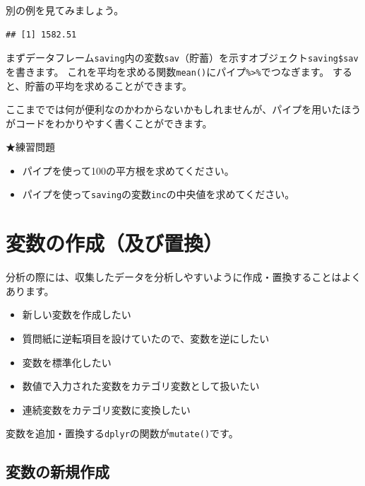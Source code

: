 \documentclass[]{book}
\newenvironment{Shaded}{\begin{snugshade}}{\end{snugshade}}
\newcommand{\KeywordTok}[1]{\textcolor[rgb]{0.13,0.29,0.53}{\textbf{#1}}}
\newcommand{\StringTok}[1]{\textcolor[rgb]{0.31,0.60,0.02}{#1}}
\newcommand{\OperatorTok}[1]{\textcolor[rgb]{0.81,0.36,0.00}{\textbf{#1}}}
\newcommand{\NormalTok}[1]{#1}
\providecommand{\tightlist}{%
  \setlength{\itemsep}{0pt}\setlength{\parskip}{0pt}}
\begin{document}
別の例を見てみましょう。

\begin{Shaded}
\end{Shaded}

\begin{verbatim}
## [1] 1582.51
\end{verbatim}

まずデータフレーム\texttt{saving}内の変数\texttt{sav}（貯蓄）を示すオブジェクト\texttt{saving\$sav}を書きます。
これを平均を求める関数\texttt{mean()}にパイプ\texttt{\%\textgreater{}\%}でつなぎます。
すると、貯蓄の平均を求めることができます。

ここまででは何が便利なのかわからないかもしれませんが、パイプを用いたほうがコードをわかりやすく書くことができます。

★練習問題

\begin{itemize}
\tightlist
\item
  パイプを使って100の平方根を求めてください。
\item
  パイプを使って\texttt{saving}の変数\texttt{inc}の中央値を求めてください。
\end{itemize}

\section{変数の作成（及び置換）}\label{ux5909ux6570ux306eux4f5cux6210ux53caux3073ux7f6eux63db}

分析の際には、収集したデータを分析しやすいように作成・置換することはよくあります。

\begin{itemize}
\tightlist
\item
  新しい変数を作成したい
\item
  質問紙に逆転項目を設けていたので、変数を逆にしたい
\item
  変数を標準化したい
\item
  数値で入力された変数をカテゴリ変数として扱いたい
\item
  連続変数をカテゴリ変数に変換したい
\end{itemize}

変数を追加・置換する\texttt{dplyr}の関数が\texttt{mutate()}です。

\subsection{変数の新規作成}\label{ux5909ux6570ux306eux65b0ux898fux4f5cux6210}
\end{document}
